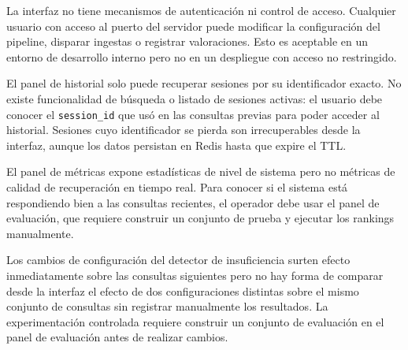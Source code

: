 \documentclass[11pt]{article}
\begin{document}
La interfaz no tiene mecanismos de autenticación ni control de acceso. Cualquier usuario con
acceso al puerto del servidor puede modificar la configuración del pipeline, disparar
ingestas o registrar valoraciones. Esto es aceptable en un entorno de desarrollo interno pero
no en un despliegue con acceso no restringido.

El panel de historial solo puede recuperar sesiones por su identificador exacto. No existe
funcionalidad de búsqueda o listado de sesiones activas: el usuario debe conocer el
\texttt{session\_id} que usó en las consultas previas para poder acceder al historial. Sesiones
cuyo identificador se pierda son irrecuperables desde la interfaz, aunque los datos persistan
en Redis hasta que expire el TTL.

El panel de métricas expone estadísticas de nivel de sistema pero no métricas de calidad de
recuperación en tiempo real. Para conocer si el sistema está respondiendo bien a las consultas
recientes, el operador debe usar el panel de evaluación, que requiere construir un conjunto de
prueba y ejecutar los rankings manualmente.

Los cambios de configuración del detector de insuficiencia surten efecto inmediatamente sobre
las consultas siguientes pero no hay forma de comparar desde la interfaz el efecto de dos
configuraciones distintas sobre el mismo conjunto de consultas sin registrar manualmente los
resultados. La experimentación controlada requiere construir un conjunto de evaluación en el
panel de evaluación antes de realizar cambios.
\end{document}
